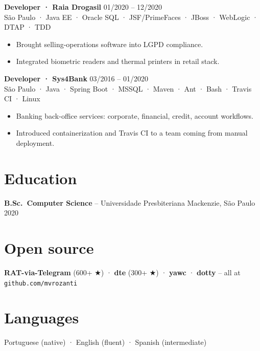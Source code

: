 \documentclass[11pt,a4paper]{article}
\begin{document}
\noindent\textbf{Developer · Raia Drogasil} \hfill 01/2020 -- 12/2020\\
{\small\color{muted}São Paulo · Java EE · Oracle SQL · JSF/PrimeFaces · JBoss · WebLogic · DTAP · TDD}
\begin{itemize}
\item Brought selling-operations software into LGPD compliance.
\item Integrated biometric readers and thermal printers in retail stack.
\end{itemize}

\noindent\textbf{Developer · Sys4Bank} \hfill 03/2016 -- 01/2020\\
{\small\color{muted}São Paulo · Java · Spring Boot · MSSQL · Maven · Ant · Bash · Travis CI · Linux}
\begin{itemize}
\item Banking back-office services: corporate, financial, credit, account workflows.
\item Introduced containerization and Travis CI to a team coming from manual deployment.
\end{itemize}

\section{Education}
\noindent\textbf{B.Sc.\ Computer Science} -- Universidade Presbiteriana Mackenzie, São Paulo \hfill 2020

\section{Open source}
\noindent
\textbf{RAT-via-Telegram} (600+ ★) · \textbf{dte} (300+ ★) · \textbf{yawc} · \textbf{dotty} -- all at \texttt{github.com/mvrozanti}

\section{Languages}
Portuguese (native) · English (fluent) · Spanish (intermediate)
\end{document}
